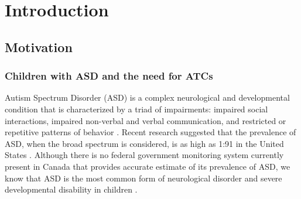 \documentclass{ut-thesis}
\begin{document}
\begin{preliminary}



\end{preliminary}





\chapter{Introduction}


\section{Motivation}

\subsection{Children with ASD and the need for ATCs}

Autism Spectrum Disorder (ASD) is a complex neurological and developmental condition that is characterized by a triad of impairments: impaired social interactions, impaired non-verbal and verbal communication, and restricted or repetitive patterns of behavior \cite{frith2005autism}.  Recent research suggested that the prevalence of ASD, when the broad spectrum is considered, is as high as 1:91 in the United States \cite{kogan2009prevalence}.  Although there is no federal government monitoring system currently present in Canada that provides accurate estimate of its prevalence of ASD, we know that ASD is the most common form of neurological disorder and severe developmental disability in children \cite{autism2014facts}.
\end{document}
